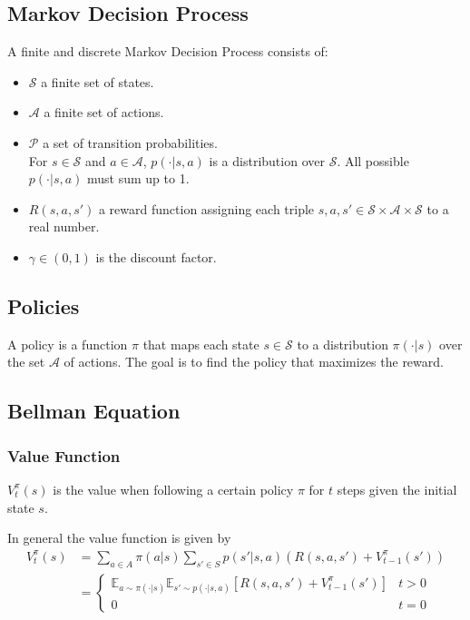 \subsection{Markov Decision Process}

A finite and discrete Markov Decision Process consists of:

\begin{itemize}
    \item $\mathcal{S}$ a finite set of states.
    \item $\mathcal{A}$ a finite set of actions.
    \item $\mathcal{P}$ a set of transition probabilities. \\ For $s \in \mathcal{S}$ and $a \in \mathcal{A}$, $p(\cdot | s,a)$ is a distribution over $\mathcal{S}$. All possible $p(\cdot | s,a)$ must sum up to 1.
    \item $R(s, a, s')$ a reward function assigning each triple $s, a, s' \in \mathcal{S} \times \mathcal{A} \times \mathcal{S}$ to a real number.
    \item $\gamma \in (0,1)$ is the discount factor.
\end{itemize}

\subsection{Policies}

A policy is a function $\pi$ that maps each state $s \in \mathcal{S}$ to a distribution $\pi(\cdot|s)$ over the set $\mathcal{A}$ of actions.
\newpar{}
The goal is to find the policy that maximizes the reward.

\subsection{Bellman Equation}
\subsubsection{Value Function}
$V_{t}^{\pi}(s)$ is the value when following a certain policy $\pi$ for $t$ steps given the initial state $s$.

\newpar{}

In general the value function is given by
\begin{align*}
    V_{t}^{\pi}(s) & = \sum_{a\in A}\pi(a|s) \sum_{s' \in S} p(s'|s,a)\left(R(s,a,s')+V_{t-1}^{\pi}(s')\right)                                                   \\
                   & = \begin{cases}
                           \mathbb{E}_{a \sim \pi(\cdot|s)} \mathbb{E}_{s' \sim p(\cdot|s, a)} \left[R(s,a,s') + V_{t-1}^{\pi}(s')\right] & t > 0 \\
                           0                                                                                                              & t=0
                       \end{cases}
\end{align*}

